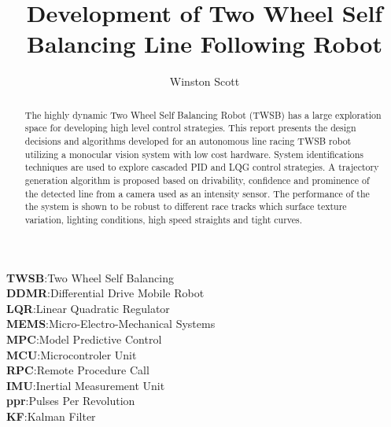 
    
    \makeatletter
    \title{Development of Two Wheel Self Balancing Line Following Robot} %
    \author{Winston Scott}
    \makeatother                                               
    \maketitle

    \uomtoc
    \begin{uomterms}
        \textbf{TWSB}:Two Wheel Self Balancing \\
        \textbf{DDMR}:Differential Drive Mobile Robot \\
        \textbf{LQR}:Linear Quadratic Regulator \\
        \textbf{MEMS}:Micro-Electro-Mechanical Systems \\
        \textbf{MPC}:Model Predictive Control \\
        \textbf{MCU}:Microcontroler Unit \\
        \textbf{RPC}:Remote Procedure Call \\
        \textbf{IMU}:Inertial Measurement Unit \\
        \textbf{ppr}:Pulses Per Revolution \\
        \textbf{KF}:Kalman Filter \\
    \end{uomterms}

    \begin{abstract} %
        The highly dynamic Two Wheel Self Balancing Robot 
        (TWSB) has a large exploration space for developing high level 
        control strategies. 
        This report presents the design decisions and algorithms developed for
        an autonomous line racing TWSB robot utilizing a monocular vision system with low cost hardware. 
        System identifications techniques are used to explore
        cascaded PID and LQG control strategies.
        A trajectory generation algorithm is proposed based on drivability, confidence 
        and prominence of the detected line from a camera used as an intensity sensor. 
        The performance of the the system is shown to be robust to different race tracks which
        surface texture variation, lighting conditions, high speed straights and tight curves. 
  \end{abstract}%
  \clearpage

